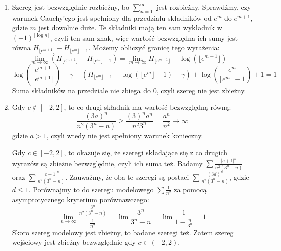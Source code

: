 \documentclass{../note}
\begin{document}
\begin{rozwiazanie}
\begin{enumerate}[label=(\alph*)]
    \[\sum_{n=2}^{\infty}\left(\sqrt[n]{a}-\frac{\sqrt[n]{b}+\sqrt[n]{c}}{2}\right) = \sum_{n=2}^{\infty}\left(1+\frac{1}{n}\log a - \frac{1+\frac{1}{n}\log b + 1 + \frac{1}{n}\log c}{2}\right) +\]\[ \sum_{n=2}^{\infty}\left(\sqrt[n]{a}-1-\frac{1}{n}\log a - \frac{\sqrt[n]{b}-1-\frac{1}{n}\log b + \sqrt[n]{c}-1-\frac{1}{n}\log c}{2}\right)\]
    i to jest zbieżne, gdy pierwszy człon jest zbieżny. Możemy uprościć pierwszy człon, jest on równy $\left(\log a - \frac{\log b + \log c}{2}\right)\sum_{n=2}^{\infty}\frac{1}{n}$ czyli to jest zbieżne w.t.w. gdy \[\log a - \frac{\log b + \log c}{2} = 0\]
    $\sqrt[n]{a}-\frac{\sqrt[n]{b}+\sqrt[n]{c}}{2}$ różni się od $\frac{1}{n}(\log a-\frac{\log b+\log c}{2})$ o maksymalnie
    $$ \frac{1}{n^{2}}\left((\log a)^{2}+\frac{(\log b)^{2}+(\log c)^{2}}{2}\right) $$
    a iloraz tych wyrażeń zbiega do 0 (tak jak $\frac{1}{n}$), czyli od pewnego momentu ciąg $\sqrt[n]{a}-\frac{\sqrt[n]{b}+\sqrt[n]{c}}{2}$ ma ten sam znak, czyli zbieżność bezwzględna też zachodzi w.t.w. gdy $\log a - \frac{\log b + \log c}{2} = 0$.
    \item Szereg jest bezwzględnie rozbieżny, bo $\sum_{n=1}^{\infty}$ jest rozbieżny. Sprawdźmy, czy warunek Cauchy'ego jest spełniony dla przedziału składników od $e^m$ do $e^{m+1}$, gdzie $m$ jest dowolnie duże. Te składniki mają ten sam wykładnik w $(-1)^{\lfloor \log n \rfloor}$, czyli ten sam znak, więc wartość bezwzględna ich sumy jest równa $H_{\lfloor e^{m+1} \rfloor} - H_{\lfloor e^m \rfloor - 1}$. Możemy obliczyć granicę tego wyrażenia:
    $$ \lim_{m\to\infty} \left( H_{\lfloor e^{m+1}\rfloor} - H_{\lfloor e^m \rfloor - 1} \right) = \lim_{m\to\infty} H_{\lfloor e^{m+1}\rfloor} - \log(\lfloor e^{m+1}\rfloor) -$$
    $$ \log\left(\frac{e^{m+1}}{\lfloor e^{m+1}\rfloor}\right) - \gamma - \left( H_{\lfloor e^m \rfloor - 1} - \log(\lfloor e^m \rfloor - 1) - \gamma \right) +\log\left(\frac{e^m}{\lfloor e^m \rfloor - 1}\right) + 1 = 1 $$
    Suma składników na przedziale nie zbiega do 0, czyli szereg nie jest zbieżny.
    \item Gdy $c \notin [-2, 2]$, to co drugi składnik ma wartość bezwzględną równą:
$$ \frac{(3a)^n}{n^{2}(3^{n}-n)} \ge \frac{(3)^n a^n}{n^{2} 3^{n}} = \frac{a^{n}}{n^{2}} \to \infty $$
gdzie $a > 1$, czyli wtedy nie jest spełniony warunek konieczny. 

Gdy $c \in [-2, 2]$, to okazuje się, że szeregi składające się z co drugich wyrazów są zbieżne bezwzględnie, czyli ich suma też.
Badamy $\sum \frac{|c+1|^n}{n^2(3^n-n)}$ oraz $\sum \frac{|c-1|^n}{n^2(3^n-n)}$.
Zauważmy, że oba te szeregi są postaci $\sum \frac{(3d)^n}{n^2(3^n-n)}$, gdzie $d \le 1$.
Porównajmy to do szeregu modelowego $\sum \frac{1}{n^2}$ za pomocą asymptotycznego kryterium porównawczego:
$$ \lim_{n \to \infty} \frac{\frac{3^n}{n^2(3^n-n)}}{\frac{1}{n^2}} = \lim \frac{3^n}{3^n-n} = \lim \frac{1}{1-\frac{n}{3^n}} = 1 $$
Skoro szereg modelowy jest zbieżny, to badane szeregi też. Zatem szereg wejściowy jest zbieżny bezwzględnie gdy $c \in (-2, 2)$.


\end{enumerate}
\end{rozwiazanie}
\end{document}
